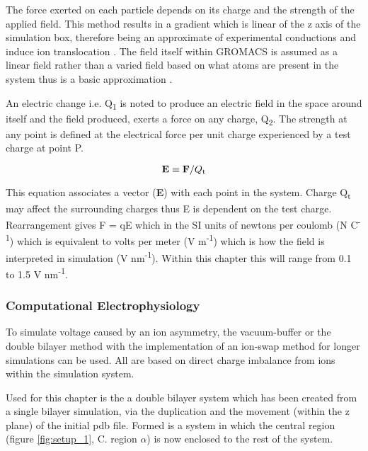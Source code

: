 The force exerted on each particle depends on its charge and the strength of the applied field. This method results in a gradient which is linear of the z axis of the simulation box, therefore being an approximate of experimental conductions \cite{Roux2008} and induce ion translocation \cite{Delemotte2008}. The field itself within GROMACS is assumed as a linear field rather than a varied field based on what atoms are present in the system thus is a basic approximation \cite{Apol2013}. 

An electric change i.e. Q\textsubscript{1} is noted to produce an electric field in the space around itself and the field produced, exerts a force on any charge, Q\textsubscript{2}. The strength at any point is defined at the electrical force per unit charge experienced by a test charge at point P. 

\begin{equation}
\textbf{E} \equiv \textbf{F}/Q\textsubscript{t}
\label{eq:field1}
\end{equation} 

This equation associates a vector (\textbf{E}) with each point in the system. Charge Q\textsubscript{t} may affect the surrounding charges thus E is dependent on the test charge. Rearrangement gives F = qE which in the  SI units of newtons per coulomb (N C\textsuperscript{-1}) which is equivalent to volts per meter (V m\textsuperscript{-1}) which is how the field is interpreted in simulation  (V nm\textsuperscript{-1}). Within this chapter this will range from 0.1 to 1.5 V nm\textsuperscript{-1}.

\subsubsection*{Computational Electrophysiology}

To simulate voltage caused by an ion asymmetry, the vacuum-buffer \cite{Delemotte2008} or the double bilayer method \cite{Sachs2004a,Dzubiella2004d,Gurtovenko2005a,Denning2008} with the implementation of an ion-swap method for longer simulations \cite{Kutzner2011} can be used. All are based on direct charge imbalance from ions within the simulation system. 

Used for this chapter is the a double bilayer system which has been created from a single bilayer simulation, via the duplication and the movement (within the z plane) of the initial pdb file.  Formed is a system in which the central region (figure \ref{fig:setup_1}, C. region $\alpha$) is now enclosed to the rest of the system. 


